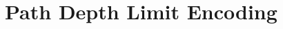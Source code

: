 \documentclass[a4paper]{article}
\begin{document}
\section{Path Depth Limit Encoding}
\end{document}
